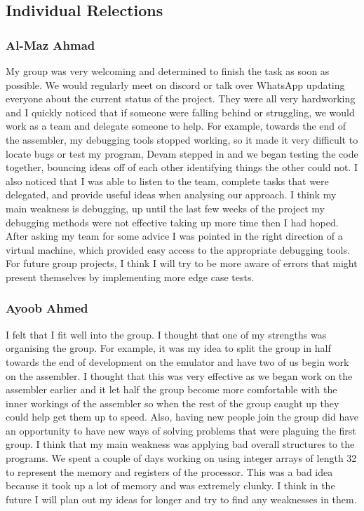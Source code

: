 \documentclass[11pt]{article}
\begin{document}
\subsection{Individual Relections}
\subsubsection{Al-Maz Ahmad}
My group was very welcoming and determined to finish the task as soon as possible. We would regularly meet on discord or talk over WhatsApp updating everyone about the current status of the project. They were all very hardworking and I quickly noticed that if someone were falling behind or struggling, we would work as a team and delegate someone to help. For example, towards the end of the assembler, my debugging tools stopped working, so it made it very difficult to locate bugs or test my program, Devam stepped in and we began testing the code together, bouncing ideas off of each other identifying things the other could not. I also noticed that I was able to listen to the team, complete tasks that were delegated, and provide useful ideas when analysing our approach. I think my main weakness is debugging, up until the last few weeks of the project my debugging methods were not effective taking up more time then I had hoped. After asking my team for some advice I was pointed in the right direction of a virtual machine, which provided easy access to the appropriate debugging tools. For future group projects, I think I will try to be more aware of errors that might present themselves by implementing more edge case tests.
\subsubsection{Ayoob Ahmed}
I felt that I fit well into the group. I thought that one of my strengths was organising the group. For example, it was my idea to split the group in half towards the end of development on the emulator and have two of us begin work on the assembler. I thought that this was very effective as we began work on the assembler earlier and it let half the group become more comfortable with the inner workings of the assembler so when the rest of the group caught up they could help get them up to speed. Also, having new people join the group did have an opportunity to have new ways of solving problems that were plaguing the first group. I think that my main weakness was applying bad overall structures to the programs. We spent a couple of days working on using integer arrays of length 32 to represent the memory and registers of the processor. This was a bad idea because it took up a lot of memory and was extremely clunky. I think in the future I will plan out my ideas for longer and try to find any weaknesses in them.
\end{document}

